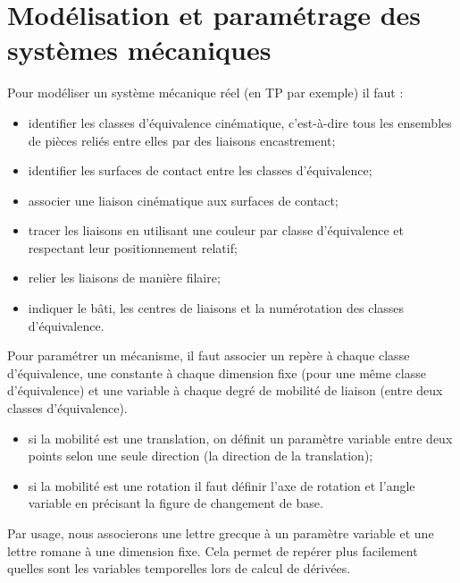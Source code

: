 \documentclass[10pt,fleqn]{article} %
\begin{document}

\vspace{2cm}
\pagestyle{fancy}
\thispagestyle{plain}

\section{Modélisation et paramétrage des systèmes mécaniques}
\begin{methode}

Pour modéliser un système mécanique réel (en TP par exemple) il faut : 
\begin{itemize}
\item identifier les classes d'équivalence cinématique, c'est-à-dire tous les ensembles de pièces reliés entre elles par des liaisons encastrement;
\item identifier les surfaces de contact entre les classes d'équivalence;
\item associer une liaison cinématique aux surfaces de contact;
\item tracer les liaisons en utilisant une couleur par classe d'équivalence et respectant leur positionnement relatif;
\item relier les liaisons de manière filaire;
\item indiquer le bâti, les centres de liaisons et la numérotation des classes d'équivalence.
\end{itemize}
\end{methode}

\begin{methode}
Pour paramétrer un mécanisme, il faut associer un repère à chaque classe d'équivalence, une constante à chaque dimension fixe (pour une même classe d'équivalence) et une variable à chaque degré de mobilité de liaison (entre deux classes d'équivalence). 
\begin{itemize}
\item si la mobilité est une translation, on définit un paramètre variable entre deux points selon une seule direction (la direction de la translation);
\item si la mobilité est une rotation il faut définir l'axe de rotation et l'angle variable en précisant la figure de changement de base.
\end{itemize}
\begin{rem}
Par usage, nous associerons une lettre grecque à un paramètre variable et une lettre romane à une dimension fixe. Cela permet de repérer plus facilement quelles sont les variables temporelles lors de calcul de dérivées. 
\end{rem}
\end{methode}
\end{document}
